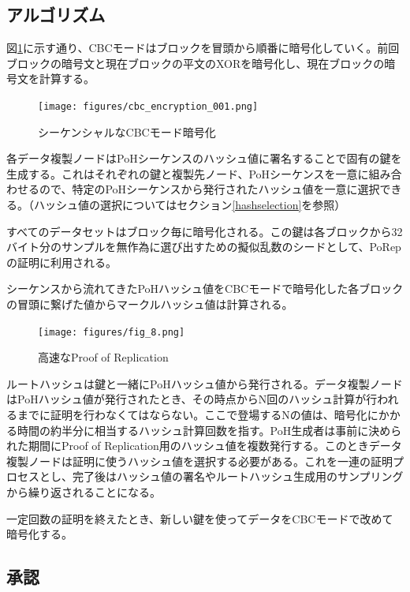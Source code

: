 \documentclass[12pt]{ltjsarticle}
\begin{document}
\subsection{アルゴリズム}
図\ref{fig:encrypt}に示す通り、CBCモードはブロックを冒頭から順番に暗号化していく。前回ブロックの暗号文と現在ブロックの平文のXORを暗号化し、現在ブロックの暗号文を計算する。

\begin{figure}
  \begin{center}
    \centering
    \texttt{[image: figures/cbc\_encryption\_001.png]}
    \caption[図7]{シーケンシャルなCBCモード暗号化\label{fig:encrypt}}
  \end{center}
  \end{figure}

各データ複製ノードはPoHシーケンスのハッシュ値に署名することで固有の鍵を生成する。これはそれぞれの鍵と複製先ノード、PoHシーケンスを一意に組み合わせるので、特定のPoHシーケンスから発行されたハッシュ値を一意に選択できる。（ハッシュ値の選択についてはセクション\ref{hashselection}を参照）

すべてのデータセットはブロック毎に暗号化される。この鍵は各ブロックから32バイト分のサンプルを無作為に選び出すための擬似乱数のシードとして、PoRepの証明に利用される。

シーケンスから流れてきたPoHハッシュ値をCBCモードで暗号化した各ブロックの冒頭に繋げた値からマークルハッシュ値は計算される。

\begin{figure}
  \begin{center}
    \centering
    \texttt{[image: figures/fig\_8.png]}
    \caption[図8]{高速なProof of Replication\label{fig_8}}
  \end{center}
  \end{figure}

ルートハッシュは鍵と一緒にPoHハッシュ値から発行される。データ複製ノードはPoHハッシュ値が発行されたとき、その時点からN回のハッシュ計算が行われるまでに証明を行わなくてはならない。ここで登場するNの値は、暗号化にかかる時間の約半分に相当するハッシュ計算回数を指す。PoH生成者は事前に決められた期間にProof of Replication用のハッシュ値を複数発行する。このときデータ複製ノードは証明に使うハッシュ値を選択する必要がある。これを一連の証明プロセスとし、完了後はハッシュ値の署名やルートハッシュ生成用のサンプリングから繰り返されることになる。

一定回数の証明を終えたとき、新しい鍵を使ってデータをCBCモードで改めて暗号化する。

\subsection{承認}
\end{document}
